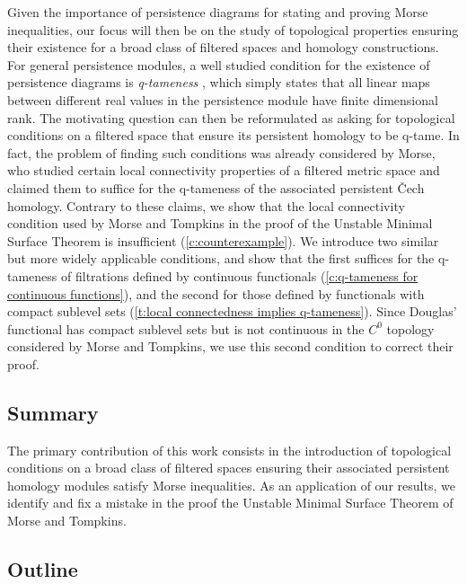 Given the importance of persistence diagrams for stating and proving Morse inequalities, our focus will then be on the study of topological properties ensuring their existence for a broad class of filtered spaces and homology constructions.
For general persistence modules, a well studied condition for the existence of persistence diagrams is \emph{q-tameness} \cite{Chazal.2016a,Chazal.2016b}, which simply states that all linear maps between different real values in the persistence module have finite dimensional rank.
The motivating question can then be reformulated as asking for topological conditions on a filtered space that ensure its persistent homology to be q-tame.
In fact, the problem of finding such conditions was already considered by Morse, who studied certain local connectivity properties of a filtered metric space and claimed them to suffice for the q-tameness of the associated persistent \v{C}ech homology.
Contrary to these claims, we show that the local connectivity condition used by Morse and Tompkins in the proof of the Unstable Minimal Surface Theorem is insufficient (\cref{c:counterexample}).
We introduce two similar but more widely applicable conditions, and show that the first suffices for the \mbox{q-tameness} of filtrations defined by continuous functionals (\cref{c:q-tameness for continuous functions}), and the second for those defined by functionals with compact sublevel sets (\cref{t:local connectedness implies q-tameness}).
Since Douglas' functional has compact sublevel sets but is not continuous in the $C^0$ topology considered by Morse and Tompkins, we use this second condition to correct their proof.

\subsection*{Summary}

The primary contribution of this work consists in the introduction of topological conditions on a broad class of filtered spaces ensuring their associated persistent homology modules satisfy Morse inequalities.
As an application of our results, we identify and fix a mistake in the proof the Unstable Minimal Surface Theorem of Morse and Tompkins.

\subsection*{Outline}

